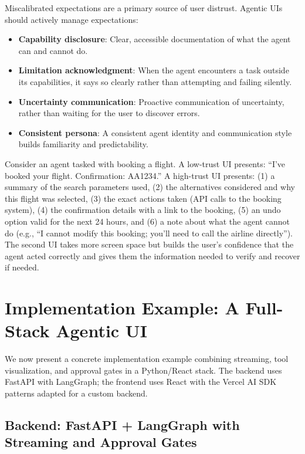 Miscalibrated expectations are a primary source of user distrust. Agentic UIs should actively manage expectations:

\begin{itemize}
  \item \textbf{Capability disclosure}: Clear, accessible documentation of what the agent can and cannot do.
  \item \textbf{Limitation acknowledgment}: When the agent encounters a task outside its capabilities, it says so clearly rather than attempting and failing silently.
  \item \textbf{Uncertainty communication}: Proactive communication of uncertainty, rather than waiting for the user to discover errors.
  \item \textbf{Consistent persona}: A consistent agent identity and communication style builds familiarity and predictability.
\end{itemize}

\begin{examplebox}
Consider an agent tasked with booking a flight. A low-trust UI presents: ``I’ve booked your flight. Confirmation: AA1234.'' A high-trust UI presents: (1) a summary of the search parameters used, (2) the alternatives considered and why this flight was selected, (3) the exact actions taken (API calls to the booking system), (4) the confirmation details with a link to the booking, (5) an undo option valid for the next 24 hours, and (6) a note about what the agent cannot do (e.g., ``I cannot modify this booking; you’ll need to call the airline directly''). The second UI takes more screen space but builds the user’s confidence that the agent acted correctly and gives them the information needed to verify and recover if needed.
\end{examplebox}

\section{Implementation Example: A Full-Stack Agentic UI}
\label{subsec:ui-implementation}

We now present a concrete implementation example combining streaming, tool visualization, and approval gates in a Python/React stack. The backend uses FastAPI with LangGraph; the frontend uses React with the Vercel AI SDK patterns adapted for a custom backend.

\subsection{Backend: FastAPI + LangGraph with Streaming and Approval Gates}
\label{backend-fastapi-langgraph-with-streaming-and-approval-gates}

